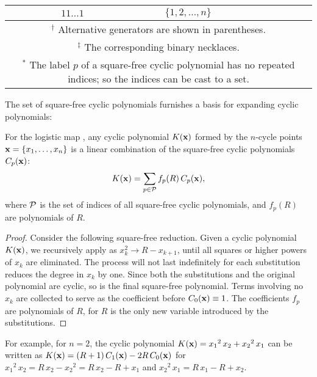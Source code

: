 \documentclass[twocolumn]{revtex4-1}
\begin{document}
\begin{table*}[t]
\begin{center}
\begin{tabular}{c c c c c}
              & $11\ldots1$
              & $\{1, 2, \ldots, n\}$  \\
\hline
\multicolumn{5}{p{\linewidth}}{
$^\dagger$ Alternative generators are shown in parentheses.
}\\
\multicolumn{5}{p{\linewidth}}{
$^\ddagger$ The corresponding binary necklaces.
}\\
\multicolumn{5}{p{\linewidth}}{
$^*$ The label $p$ of a square-free cyclic polynomial
    has no repeated indices;
    so the indices can be cast to a set.
}\\
\hline
\end{tabular}
\end{center}
\label{tab:sqrfreepoly}
\end{table*}

The set of square-free cyclic polynomials
  furnishes a basis for expanding cyclic polynomials:


\begin{theorem}
  For the logistic map ,
  any cyclic polynomial $K(\mathbf{x})$
  formed by the $n$-cycle points
  $\mathbf{x} = \{x_1, \ldots, x_n\}$
  is a linear combination of
the square-free cyclic polynomials $C_p(\mathbf{x})$:
\[
  K(\mathbf{x}) = \sum_{p \in \mathcal P} f_p(R) \, C_p(\mathbf{x}),
\]
  where $\mathcal P$ %
  is the set of indices of all square-free cyclic polynomials,
  and $f_p(R)$ are polynomials of $R$.
  \label{thm:sqrfree}
\end{theorem}


\begin{proof}
Consider the following square-free reduction.
%
Given a cyclic polynomial $K(\mathbf{x})$,
  we recursively apply  as
  $x_k^2 \rightarrow R - x_{k+1}$,
  until all squares or higher powers of $x_k$ are eliminated.
The process will not last indefinitely
  for each substitution reduces the degree in $x_k$ %
  by one.
Since both the substitutions and the original polynomial are cyclic,
  so is the final square-free polynomial.
Terms involving no $x_k$
  are collected to serve as the coefficient before $C_0(\mathbf{x}) \equiv 1$.
The coefficients $f_p$ are polynomials of $R$,
  for $R$ is the only new variable introduced by the substitutions.
\end{proof}



For example, for $n = 2$, the cyclic polynomial
  $K(\mathbf{x}) = {x_1}^2 \, x_2 + {x_2}^2 \, x_1$
can be written as $K(\mathbf{x}) = (R + 1) \, C_{1}(\mathbf{x}) - 2 R \, C_0(\mathbf{x})$
for
${x_1}^2 \, x_2 = R \, x_2 - {x_2}^2 = R \, x_2 - R + x_1$ and
${x_2}^2 \, x_1 = R \, x_1 - R + x_2$.
\end{document}
